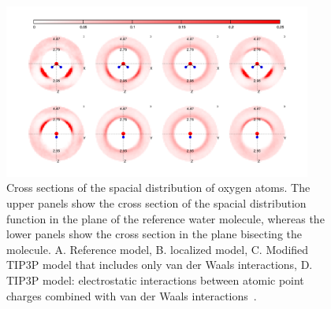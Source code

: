 \documentclass[journal=jacsat,manuscript=article]{achemso}
\begin{document}
\begin{figure}
\includegraphics[width=0.9\textwidth]{SDF}
\caption{Cross sections of the spacial distribution of oxygen atoms. 
The upper panels show the cross section of the spacial distribution function in the plane of the reference water molecule, whereas the lower panels show the cross section in the plane bisecting the molecule. 
A. Reference model, B. localized model, C. Modified TIP3P model that includes only van der Waals interactions, D. TIP3P model: electrostatic interactions between atomic point charges combined with van der Waals interactions~\cite{TIP3P}.} \label{Fig:SDF}
\end{figure}


 
\end{document}
